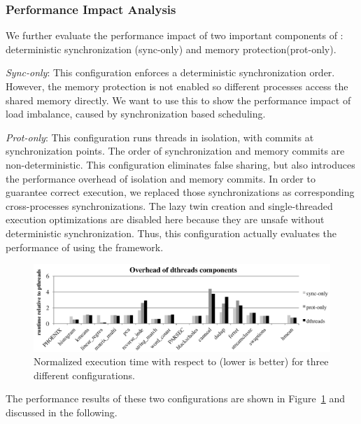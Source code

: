 \subsubsection{Performance Impact Analysis}
We further evaluate the performance impact of two important components of \dthreads: deterministic synchronization (sync-only) and memory protection(prot-only).

\emph{Sync-only}: This configuration enforces a deterministic synchronization order. However, the memory protection is not enabled so different processes access the shared memory directly. We want to use this to show the performance impact of load imbalance, caused by synchronization based scheduling.

\emph{Prot-only}: This configuration runs threads in isolation, with commits at synchronization points. The order of synchronization and memory commits are non-deterministic. This configuration eliminates false sharing, but also introduces the performance overhead of isolation and memory commits. In order to guarantee correct execution, we replaced those synchronizations as corresponding cross-processes synchronizations. The lazy twin creation and single-threaded execution optimizations are disabled here because they are unsafe without deterministic synchronization. Thus, this configuration actually evaluates the performance of using the \sheriff{} framework. 


\begin{figure}[!t]
{\centering
\includegraphics[width=6in]{dthreads/figure/perfeffect}
\caption{Normalized execution time with respect to \pthreads{} (lower is better) for three different configurations. 
\label{fig:perfanalysis}}
}
\end{figure}

The performance results of these two configurations are shown in Figure~\ref{fig:perfanalysis} and discussed in the following.

